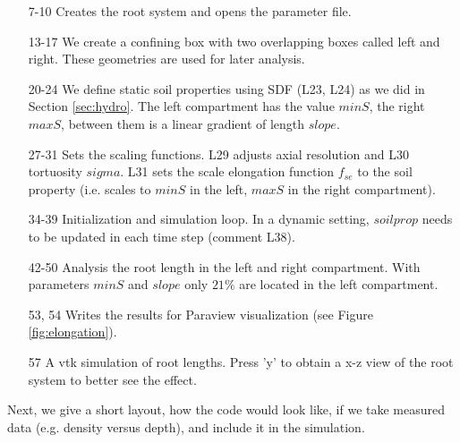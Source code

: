 \begin{itemize}

\item[7-10] Creates the root system and opens the parameter file.

\item[13-17] We create a confining box with two overlapping boxes called left and right. These geometries are used for later analysis.

\item[20-24] We define static soil properties using SDF (L23, L24) as we did in Section \ref{sec:hydro}. 
The left compartment has the value $minS$, the right $maxS$, between them is a linear gradient of length $slope$.

\item[27-31] Sets the scaling functions. L29 adjusts axial resolution and L30 tortuosity $sigma$. L31 sets the scale elongation function $f_{se}$ to the soil property (i.e. scales to $minS$ in the left, $maxS$ in the right compartment). 

\item[34-39] Initialization and simulation loop. In a dynamic setting, $soilprop$ needs to be updated in each time step (comment L38).

\item[42-50] Analysis the root length in the left and right compartment. With parameters $minS$ and $slope$ only $21\%$ are located in the left compartment.

\item[53, 54] Writes the results for Paraview visualization (see Figure \ref{fig:elongation}).

\item[57] A vtk simulation of root lengths. Press 'y' to obtain a x-z view of the root system to better see the effect. 

\end{itemize}
 
Next, we give a short layout, how the code would look like, if we take measured data (e.g. density versus depth), and include it in the simulation. 



